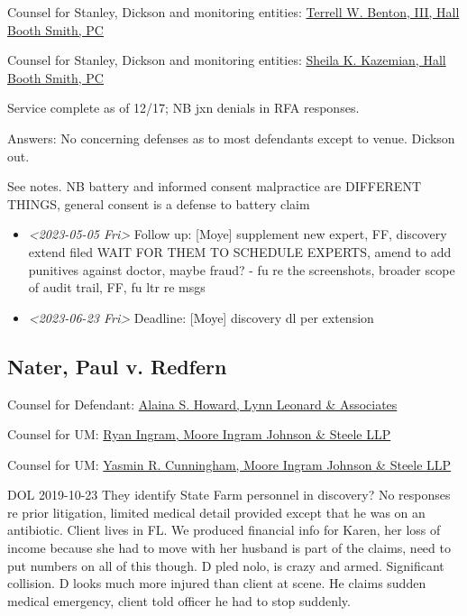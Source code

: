\documentclass[11pt]{article}
\begin{document}
Counsel for Stanley, Dickson and monitoring entities: \href{https://gabar.reliaguide.com/lawyer/30303-GA-Terrell-Benton-263119}{Terrell W. Benton, III, Hall Booth Smith, PC}

Counsel for Stanley, Dickson and monitoring entities: \href{https://gabar.reliaguide.com/lawyer/30303-GA-Sheila-Kazemian-281971}{Sheila K. Kazemian, Hall Booth Smith, PC}

Service complete as of 12/17; NB jxn denials in RFA responses.

Answers: No concerning defenses as to most defendants except to venue. Dickson out.

See notes. NB battery and informed consent malpractice are DIFFERENT THINGS, general consent is a defense to battery claim

\begin{itemize}
\item \textit{<2023-05-05 Fri> } Follow up: [Moye] supplement new expert, FF, discovery extend filed WAIT FOR THEM TO SCHEDULE EXPERTS, amend to add punitives against doctor, maybe fraud? - fu re the screenshots, broader scope of audit trail, FF, fu ltr re msgs

\item \textit{<2023-06-23 Fri> } Deadline: [Moye] discovery dl per extension
\end{itemize}

\subsection*{Nater, Paul v. Redfern}
\label{sec:orga05371e}

Counsel for Defendant: \href{https://gabar.reliaguide.com/lawyer/30345-GA-Alaina-Howard-107788}{Alaina S. Howard, Lynn Leonard \& Associates}

Counsel for UM: \href{https://gabar.reliaguide.com/lawyer/30060-GA-Ryan-Ingram-272652}{Ryan Ingram, Moore Ingram Johnson \& Steele LLP}

Counsel for UM: \href{https://gabar.reliaguide.com/lawyer/-GA-Yasmin-Cunningham-175027}{Yasmin R. Cunningham, Moore Ingram Johnson \& Steele LLP}

DOL 2019-10-23 They identify State Farm personnel in discovery? No responses re prior litigation, limited medical detail provided except that he was on an antibiotic. Client lives in FL. We produced financial info for Karen, her loss of income because she had to move with her husband is part of the claims, need to put numbers on all of this though. D pled nolo, is crazy and armed. Significant collision. D looks much more injured than client at scene. He claims sudden medical emergency, client told officer he had to stop suddenly.
\end{document}
